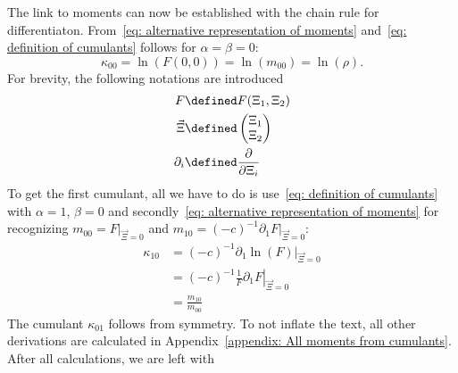 
The link to moments can now be established with the chain rule for differentiaton.
From~\eqref{eq: alternative representation of moments} and~\eqref{eq: definition of cumulants} follows for $\alpha=\beta=0$:
\begin{equation}
  \label{eq: definition of kappa_00}
  \kappa_{00} = \ln(F(0,0)) = \ln(m_{00}) = \ln(\rho).
\end{equation}
For brevity, the following notations are introduced
\begin{equation}
  \label{eq: abbreviations for deriving cumulants from moments}
  \begin{aligned}
    F & \defined F(\Xi_1, \Xi_2) \\
    \vec{\Xi} &\defined \begin{pmatrix}\Xi_1 \\ \Xi_2  \end{pmatrix} \\
    \partial_i &\defined \frac{\partial}{\partial \Xi_i}
  \end{aligned}
\end{equation}
To get the first cumulant, all we have to do is use~\eqref{eq: definition of cumulants} with $\alpha=1$, $\beta=0$ and secondly~\eqref{eq: alternative representation of moments}
for recognizing $m_{00} = \left. F \right|_{\vec{\Xi} = 0} $ and $m_{10} = {(-c)}^{-1} \left. \partial_1 F \right|_{\vec{\Xi} = 0}$:
\begin{equation}
  \label{eq: definition of kappa_10}
  \begin{aligned}
    \kappa_{10} & = {(-c)}^{-1} \left.\partial_1 \ln(F) \right|_{\vec{\Xi} = 0} \\
    & = {(-c)}^{-1} \left. \frac{1}{F} \partial_1 F \right|_{\vec{\Xi} = 0} \\
    & = \frac{m_{10}}{m_{00}}
  \end{aligned}
\end{equation}
The cumulant $\kappa_{01}$ follows from symmetry.
To not inflate the text, all other derivations are calculated in Appendix~\ref{appendix: All moments from cumulants}.
After all calculations, we are left with
